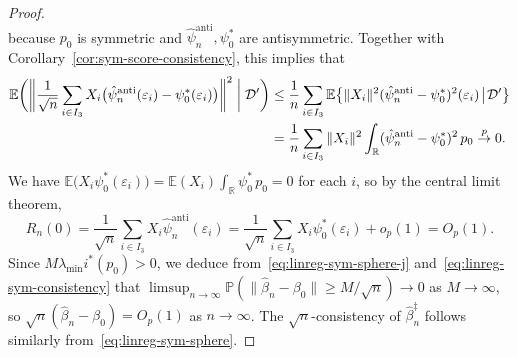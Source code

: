 \documentclass[a4paper]{article}
\newcommand{\R}{\mathbb{R}}
\newcommand{\E}{\mathbb{E}}
\renewcommand{\Pr}{\mathbb{P}}
\newcommand{\norm}[1]{\|{#1}\|}
\newcommand{\cvp}{\overset{p}{\to}}
\theoremstyle{definition}
\begin{document}
\begin{proof}
\[\]
because $p_0$ is symmetric and $\hat{\psi}_n^{\mathrm{anti}},\psi_0^*$ are antisymmetric. Together with Corollary~\ref{cor:sym-score-consistency},
this implies that
\begin{align*}
\E\biggl(\biggl\|\frac{1}{\sqrt{n}}\sum_{i \in I_3} X_i\bigl(\hat{\psi}_n^{\mathrm{anti}}(\varepsilon_i) - \psi_0^*(\varepsilon_i)\bigr)\biggr\|^2 \biggm| \mathcal{D}'\biggr) &\leq \frac{1}{n}\sum_{i \in I_3}\E\bigl\{\norm{X_i}^2 (\hat{\psi}_n^{\mathrm{anti}} - \psi_0^*)^2(\varepsilon_i)\!\bigm|\! \mathcal{D}'\bigr\} \\
&= \frac{1}{n}\sum_{i \in I_3}\norm{X_i}^2 \int_\R (\hat{\psi}_n^{\mathrm{anti}} - \psi_0^*)^2\,p_0 \cvp 0.
\end{align*}
We have $\E\bigl(X_i\psi_0^*(\varepsilon_i)\bigr) = \E(X_i)\int_\R \psi_0^*\,p_0 = 0$ for each $i$, so by the central limit theorem,
\begin{equation}
\label{eq:linreg-sym-clt}
R_n(0) = \frac{1}{\sqrt{n}}\sum_{i \in I_3} X_i\hat{\psi}_n^{\mathrm{anti}}(\varepsilon_i) = \frac{1}{\sqrt{n}}\sum_{i \in I_3} X_i\psi_0^*(\varepsilon_i) + o_p(1) = O_p(1).
\end{equation}
Since $M\lambda_{\min}i^*(p_0) > 0$, we deduce from~\eqref{eq:linreg-sym-sphere-j} and~\eqref{eq:linreg-sym-consistency} that $\limsup_{n \to \infty}\Pr(\norm{\hat{\beta}_n - \beta_0} \geq M/\sqrt{n}) \to 0$ as $M \to \infty$, so $\sqrt{n}(\hat{\beta}_n - \beta_0) = O_p(1)$ as $n \to \infty$. The $\sqrt{n}$-consistency of $\hat{\beta}_n^\ddagger$ follows similarly from~\eqref{eq:linreg-sym-sphere}.


\end{proof}
\end{document}
